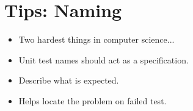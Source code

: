 \documentclass{article}
\begin{document}
\sloppy
\section{Tips: Naming}
\begin{itemize}
    \item Two hardest things in computer science...
    \item Unit test names should act as a specification.
    \item Describe what is expected.
    \item Helps locate the problem on failed test.
\end{itemize}
\end{document}
